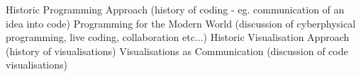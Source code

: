 










Historic Programming Approach (history of coding - eg. communication of an idea into code)
Programming for the Modern World (discussion of cyberphysical programming, live coding, collaboration etc...)
Historic Visualisation Approach (history of visualisations)
Visualisations as Communication (discussion of code visualisations)













